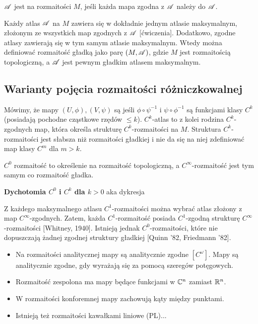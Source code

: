 \begin{definition}
  $\mathcal{A}$ jest  na rozmaitości $M$, jeśli każda mapa zgodna z $\mathcal{A}$ należy do $\mathcal{A}$.
\end{definition}

Każdy atlas $\mathcal{A}$ na $M$ zawiera się w dokładnie jednym atlasie maksymalnym, złożonym ze wszystkich map zgodnych z $\mathcal{A}$ [ćwiczenia]. Dodatkowo, zgodne atlasy zawierają się w tym samym atlasie maksymalnym. Wtedy można definiować rozmaitość gładką jako parę $(M, \mathcal{A})$, gdzie $M$ jest rozmaitością topologiczną, a $\mathcal{A}$ jest pewnym gładkim atlasem maksymalnym.
\bigskip

\subsection{Warianty pojęcia rozmaitości różniczkowalnej}

Mówimy, że mapy $(U,\phi),(V, \psi)$ są  jeśli $\phi\circ\psi^{-1}$ i $\psi\circ\phi^{-1}$ są funkcjami klasy $C^k$ (posiadają pochodne cząstkowe rzędów $\leq k$). $C^k$-atlas to z kolei rodzina $C^k$-zgodnych map, która określa strukturę $C^k$-rozmaitości na $M$. Struktura $C^k$-rozmaitości jest słabsza niż rozmaitości gładkiej i nie da się na niej zdefiniować map klasy $C^m$ dla $m>k$.

$C^0$ rozmaitość to określenie na rozmaitość topologiczną, a $C^\infty$-rozmaitość jest tym samym co rozmaitość gładka.
\medskip

\textbf{Dychotomia $C^0$ i $C^k$ dla $k>0$} aka dykresja

Z każdego maksymalnego atlasu $C^1$-rozmaitości można wybrać atlas złożony z map $C^\infty$-zgodnych. Zatem, każda $C^1$-rozmaitość posiada $C^1$-zgodną strukturę $C^\infty$-rozmaitości [Whitney, 1940]. Istnieją jednak $C^0$-rozmaitości, które nie dopuszczają żadnej zgodnej struktury gładkiej [Quinn '82, Friedmann '82].
\medskip

\begin{itemize}[leftmargin=*]
  \item Na rozmaitości analitycznej mapy są analitycznie zgodne $[C^\omega]$. Mapy są analitycznie zgodne, gdy wyrażają się za pomocą szeregów potęgowych.
  \item Rozmaitość zespolona ma mapy będące funkcjami w $\mathbb{C}^n$ zamiast $\mathbb{R}^n$.
  \item W rozmaitości konforemnej mapy zachowują kąty między punktami.
  \item Istnieją też rozmaitości kawałkami liniowe (PL)...
\end{itemize}

